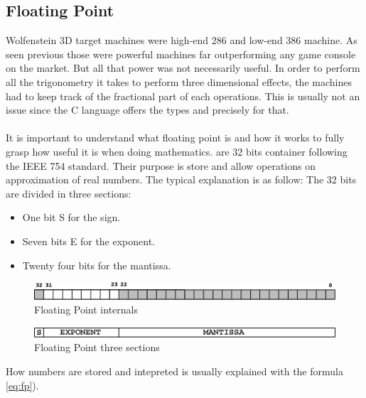\documentclass[book.tex]{subfiles}
\begin{document}
  \subsection{Floating Point}
  
  Wolfenstein 3D target machines were high-end 286 and low-end 386 machine. As seen previous those were powerful machines far outperforming any game console on the market. But all that power was not necessarily useful. In order to perform all the trigonometry it takes to perform three dimensional effects, the machines had to keep track of the fractional part of each operations. This is usually not an issue since the C language offers the types  and  precisely for that.\\
\\
It is important to understand what floating point is and how it works to fully grasp how useful it is when doing mathematics.  are 32 bits container following the IEEE 754 standard. Their purpose is store and allow operations on approximation of real numbers. The typical explanation is as follow: The 32 bits are divided in three sections:\\
\begin{itemize}
  \item One bit S for the sign.
  \item Seven bits E for the exponent.
  \item Twenty four bits for the mantissa.
\end{itemize} 

\begin{figure}[H]
\centering
\includegraphics[scale=0.4]{imgs/floating_point_layout.eps}
\caption{Floating Point internals}
\label{fig:fp_internals}
\end{figure}
  \bigskip



\begin{figure}[H]
\centering
\includegraphics[scale=0.4]{imgs/floating_point_math.eps}
\caption{Floating Point three sections}
\label{fig:fp_regions}
\end{figure}
  \bigskip  


How numbers are stored and intepreted is usually explained with the formula \ref{eq:fp}).\
\end{document}
